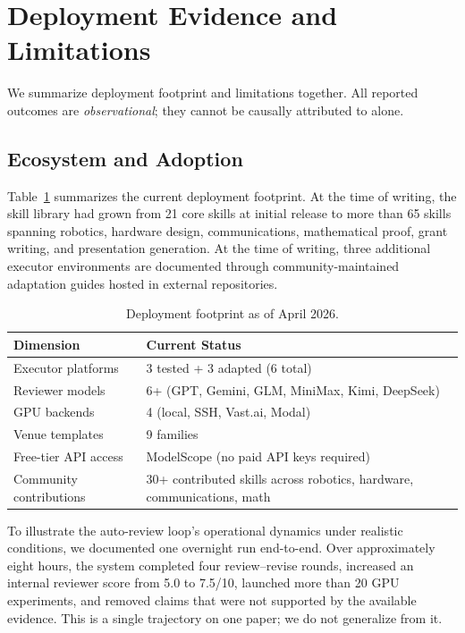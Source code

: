 \section{Deployment Evidence and Limitations}
\label{sec:evidence}

We summarize deployment footprint and limitations together.
All reported outcomes are \emph{observational}; they cannot be causally attributed to \aris{} alone.

\subsection{Ecosystem and Adoption}

Table~\ref{tab:ecosystem} summarizes the current deployment footprint.
At the time of writing, the skill library had grown from 21 core skills at initial release to more than 65 skills spanning robotics, hardware design, communications, mathematical proof, grant writing, and presentation generation.
At the time of writing, three additional executor environments are documented through community-maintained adaptation guides hosted in external repositories.

\begin{table}[t]
\centering
\caption{Deployment footprint as of April 2026.}
\label{tab:ecosystem}
\small
\begin{tabular}{@{}ll@{}}
\toprule
\textbf{Dimension} & \textbf{Current Status} \\
\midrule
Executor platforms & 3 tested + 3 adapted (6 total) \\
Reviewer models & 6+ (GPT, Gemini, GLM, MiniMax, Kimi, DeepSeek) \\
GPU backends & 4 (local, SSH, Vast.ai, Modal) \\
Venue templates & 9 families \\
Free-tier API access & ModelScope (no paid API keys required) \\
Community contributions & 30+ contributed skills across robotics, hardware, communications, math \\
\bottomrule
\end{tabular}
\end{table}

To illustrate the auto-review loop's operational dynamics under realistic conditions, we documented one overnight run end-to-end.
Over approximately eight hours, the system completed four review--revise rounds, increased an internal reviewer score from 5.0 to 7.5/10, launched more than 20 GPU experiments, and removed claims that were not supported by the available evidence.
This is a single trajectory on one paper; we do not generalize from it.

